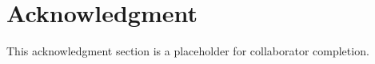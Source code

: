 \section*{Acknowledgment}

This acknowledgment section is a placeholder for collaborator completion.
